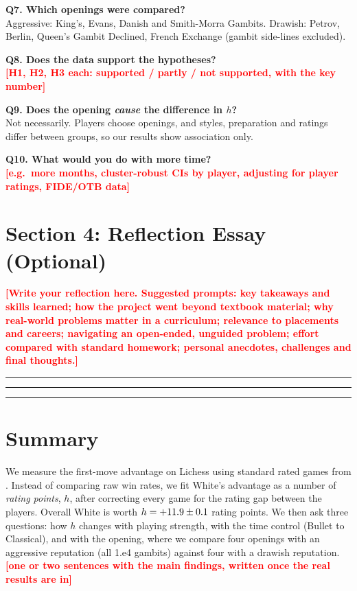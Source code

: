 \documentclass[11pt,a4paper]{article}
\newcommand{\TBD}[1]{\textcolor{red}{\textbf{[#1]}}}
\begin{document}
\textbf{Q7. Which openings were compared?}\\
Aggressive: King's, Evans, Danish and Smith-Morra Gambits. Drawish: Petrov, Berlin, Queen's
Gambit Declined, French Exchange (gambit side-lines excluded).

\textbf{Q8. Does the data support the hypotheses?}\\
\TBD{H1, H2, H3 each: supported / partly / not supported, with the key number}

\textbf{Q9. Does the opening \emph{cause} the difference in $h$?}\\
Not necessarily. Players choose openings, and styles, preparation and ratings differ between
groups, so our results show association only.

\textbf{Q10. What would you do with more time?}\\
\TBD{e.g.\ more months, cluster-robust CIs by player, adjusting for player ratings, FIDE/OTB data}

\newpage

\section*{Section 4: Reflection Essay (Optional)}

\TBD{Write your reflection here. Suggested prompts: key takeaways and skills learned;
how the project went beyond textbook material; why real-world problems matter in a curriculum;
relevance to placements and careers; navigating an open-ended, unguided problem; effort
compared with standard homework; personal anecdotes, challenges and final thoughts.}

\vspace{4cm}
\hrule\vspace{1cm}\hrule\vspace{1cm}\hrule


\newpage
\section*{Summary}
We measure the first-move advantage on Lichess using \GamesUsed{} standard rated games from
\MonthList. Instead of comparing raw win rates, we fit White's advantage as a number of
\emph{rating points}, $h$, after correcting every game for the rating gap between the players.
Overall White is worth $h = +11.9 \pm 0.1$ rating points. We then ask three questions:
how $h$ changes with playing strength, with the time control (Bullet to Classical), and with
the opening, where we compare four openings with an aggressive reputation (all 1.e4 gambits)
against four with a drawish reputation.
\TBD{one or two sentences with the main findings, written once the real results are in}
\end{document}
